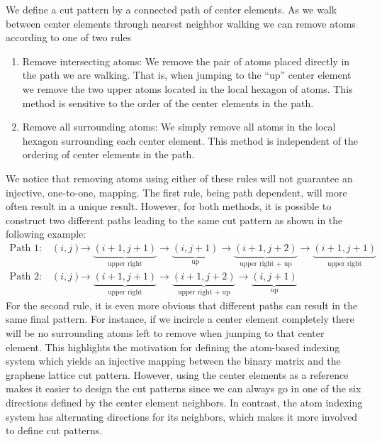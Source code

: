 We define a cut pattern by a connected path of center elements. As
we walk between center elements through nearest neighbor walking we can remove atoms according to one of two rules 
\begin{enumerate}
  \item Remove intersecting atoms: We remove the pair of atoms placed directly
  in the path we are walking. That is, when jumping to the ``up'' center
  element we remove the two upper atoms located in the local hexagon of atoms.
  This method is sensitive to the order of the center elements in the path. 
  \item Remove all surrounding atoms: We simply remove all atoms in the local
  hexagon surrounding each center element. This method is independent of the
  ordering of center elements in the path.
\end{enumerate}
We notice that removing atoms using either of these rules will not guarantee an injective, one-to-one, mapping. The first rule, being path dependent, will more often result in a unique result. However, for both methods, it is possible to construct two different paths leading to the same cut pattern as shown in the following example:
\begin{align*}
  \text{Path 1:} \quad (i, j) &\rightarrow \underbrace{(i+1,j+1)}_{\text{upper right}} \rightarrow \underbrace{(i, j+1)}_{\text{up}} \rightarrow \underbrace{(i+1, j+2)}_{\text{upper right + up}} \rightarrow \underbrace{(i+1, j+1)}_{\text{upper right}} \\
  \text{Path 2:} \quad (i, j) &\rightarrow \underbrace{(i+1,j+1)}_{\text{upper right}} \rightarrow \underbrace{(i+1, j+2)}_{\text{upper right + up}} \rightarrow \underbrace{(i, j+1)}_{\text{up}}
\end{align*}
For the second rule, it is even more obvious that different paths can result in the same final pattern. For instance, if we incircle a center element completely there will be no surrounding atoms left to remove when jumping to that center element. This highlights the motivation for defining the atom-based indexing system which yields an injective mapping between the binary matrix and the graphene lattice cut pattern. However, using the center elements as a reference makes it easier to design the cut patterns since we can always go in one of the six directions defined by the center element neighbors. In contrast, the atom indexing system has alternating directions for its neighbors, which makes it more involved to define cut patterns.


